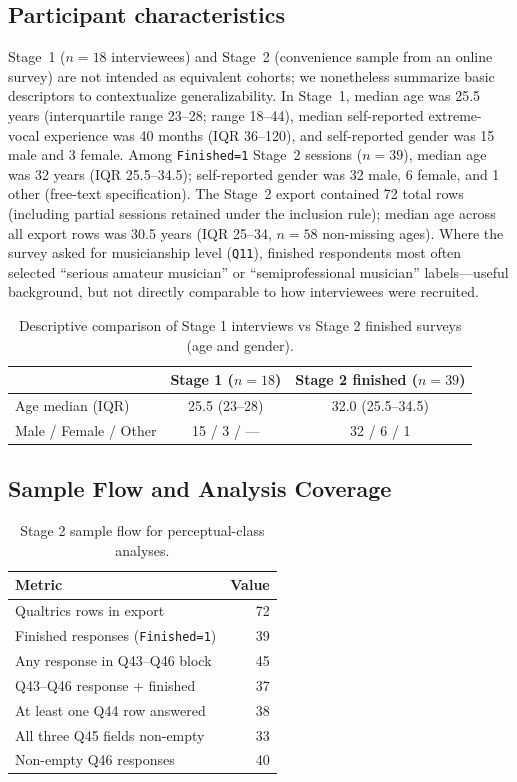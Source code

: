\documentclass{article}
\begin{document}
\subsection{Participant characteristics}
Stage~1 (\(n=18\) interviewees) and Stage~2 (convenience sample from an online survey) are not intended as equivalent cohorts; we nonetheless summarize basic descriptors to contextualize generalizability.
In Stage~1, median age was 25.5 years (interquartile range 23--28; range 18--44), median self-reported extreme-vocal experience was 40 months (IQR 36--120), and self-reported gender was 15 male and 3 female.
Among \texttt{Finished=1} Stage~2 sessions (\(n=39\)), median age was 32 years (IQR 25.5--34.5); self-reported gender was 32 male, 6 female, and 1 other (free-text specification).
The Stage~2 export contained 72 total rows (including partial sessions retained under the inclusion rule); median age across all export rows was 30.5 years (IQR 25--34, \(n=58\) non-missing ages).
Where the survey asked for musicianship level (\texttt{Q11}), finished respondents most often selected ``serious amateur musician'' or ``semiprofessional musician'' labels---useful background, but not directly comparable to how interviewees were recruited.

\begin{table}[ht]
\centering
\caption{Descriptive comparison of Stage 1 interviews vs Stage 2 finished surveys (age and gender).}
\label{tab:samplechar}
\begin{tabular}{lcc}
\toprule
 & Stage 1 (\(n=18\)) & Stage 2 finished (\(n=39\)) \\
\midrule
Age median (IQR) & 25.5 (23--28) & 32.0 (25.5--34.5) \\
Male / Female / Other & 15 / 3 / --- & 32 / 6 / 1 \\
\bottomrule
\end{tabular}
\end{table}

\subsection{Sample Flow and Analysis Coverage}
\begin{table}[ht]
\centering
\caption{Stage 2 sample flow for perceptual-class analyses.}
\label{tab:stage2flow}
\begin{tabular}{lr}
\toprule
Metric & Value \\
\midrule
Qualtrics rows in export & 72 \\
Finished responses (\texttt{Finished=1}) & 39 \\
Any response in Q43--Q46 block & 45 \\
Q43--Q46 response + finished & 37 \\
At least one Q44 row answered & 38 \\
All three Q45 fields non-empty & 33 \\
Non-empty Q46 responses & 40 \\
\bottomrule
\end{tabular}
\end{table}
\end{document}
